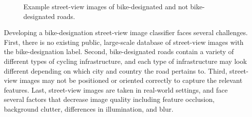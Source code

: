 \documentclass[10pt,twocolumn,letterpaper]{article}
\begin{document}
\begin{figure}
  \centering
  \hfill
  \caption{Example street-view images of bike-designated and not bike-designated roads.}
\end{figure}

Developing a bike-designation street-view image classifier faces several challenges. First, there is no existing public, large-scale database of street-view images with the bike-designation label. Second, bike-designated roads contain a variety of different types of cycling infrastructure, and each type of infrastructure may look different depending on which city and country the road pertains to. Third, street-view images may not be positioned or oriented correctly to capture the relevant features. Last, street-view images are taken in real-world settings, and face several factors that decrease image quality including feature occlusion, background clutter, differences in illumination, and blur.
\end{document}
